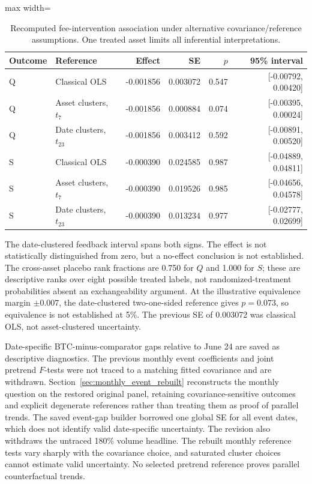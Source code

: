 \documentclass[12pt]{article}
\theoremstyle{definition}
\theoremstyle{remark}
\begin{document}
\begin{table}[htbp]
\centering\small
\caption{Recomputed fee-intervention association under alternative covariance/reference assumptions. One treated asset limits all inferential interpretations.}
\label{tab:fee_revised}
\begin{adjustbox}{max width=\textwidth}
\begin{tabular}{llrrrr}\toprule
Outcome & Reference & Effect & SE & $p$ & 95\% interval \\\midrule
Q & Classical OLS & -0.001856 & 0.003072 & 0.547 & [-0.00792, 0.00420] \\
Q & Asset clusters, $t_7$ & -0.001856 & 0.000884 & 0.074 & [-0.00395, 0.00024] \\
Q & Date clusters, $t_{23}$ & -0.001856 & 0.003412 & 0.592 & [-0.00891, 0.00520] \\
S & Classical OLS & -0.000390 & 0.024585 & 0.987 & [-0.04889, 0.04811] \\
S & Asset clusters, $t_7$ & -0.000390 & 0.019526 & 0.985 & [-0.04656, 0.04578] \\
S & Date clusters, $t_{23}$ & -0.000390 & 0.013234 & 0.977 & [-0.02777, 0.02699] \\
\bottomrule\end{tabular}
\end{adjustbox}
\end{table}

The date-clustered feedback interval spans both signs. The effect is not statistically distinguished from zero, but a no-effect conclusion is not established. The cross-asset placebo rank fractions are 0.750 for $Q$ and 1.000 for $S$; these are descriptive ranks over eight possible treated labels, not randomized-treatment probabilities absent an exchangeability argument. At the illustrative equivalence margin $\pm0.007$, the date-clustered two-one-sided reference gives $p=0.073$, so equivalence is not established at 5\%. The previous SE of 0.003072 was classical OLS, not asset-clustered uncertainty.

Date-specific BTC-minus-comparator gaps relative to June 24 are saved as descriptive diagnostics. The previous monthly event coefficients and joint pretrend $F$-tests were not traced to a matching fitted covariance and are withdrawn. Section~\ref{sec:monthly_event_rebuilt} reconstructs the monthly question on the restored original panel, retaining covariance-sensitive outcomes and explicit degenerate references rather than treating them as proof of parallel trends. The saved event-gap builder borrowed one global SE for all event dates, which does not identify valid date-specific uncertainty. The revision also withdraws the untraced 180\% volume headline. The rebuilt monthly reference tests vary sharply with the covariance choice, and saturated cluster choices cannot estimate valid uncertainty. No selected pretrend reference proves parallel counterfactual trends.
\end{document}
